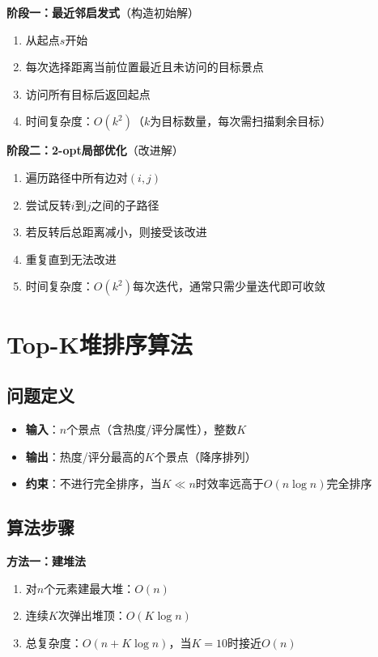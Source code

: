 \documentclass[12pt,a4paper]{report}
\begin{document}
\textbf{阶段一：最近邻启发式}（构造初始解）
\begin{enumerate}
    \item 从起点$s$开始
    \item 每次选择距离当前位置最近且未访问的目标景点
    \item 访问所有目标后返回起点
    \item 时间复杂度：$O(k^2)$（$k$为目标数量，每次需扫描剩余目标）
\end{enumerate}

\textbf{阶段二：2-opt局部优化}（改进解）
\begin{enumerate}
    \item 遍历路径中所有边对$(i, j)$
    \item 尝试反转$i$到$j$之间的子路径
    \item 若反转后总距离减小，则接受该改进
    \item 重复直到无法改进
    \item 时间复杂度：$O(k^2)$每次迭代，通常只需少量迭代即可收敛
\end{enumerate}


\section{Top-K堆排序算法}

\subsection{问题定义}

\begin{itemize}
    \item \textbf{输入}：$n$个景点（含热度/评分属性），整数$K$
    \item \textbf{输出}：热度/评分最高的$K$个景点（降序排列）
    \item \textbf{约束}：不进行完全排序，当$K \ll n$时效率远高于$O(n \log n)$完全排序
\end{itemize}

\subsection{算法步骤}

\textbf{方法一：建堆法}
\begin{enumerate}
    \item 对$n$个元素建最大堆：$O(n)$
    \item 连续$K$次弹出堆顶：$O(K \log n)$
    \item 总复杂度：$O(n + K \log n)$，当$K=10$时接近$O(n)$
\end{enumerate}
\end{document}

